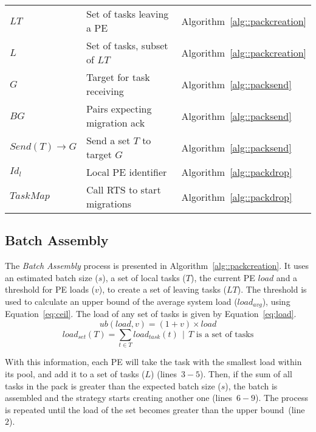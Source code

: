 \begin{table}[t]
\begin{tabular}{l l l}
		$LT$				& Set of tasks leaving a PE 							& Algorithm~\ref{alg::packcreation} \\
		$L$				& Set of tasks, subset of $LT$						& Algorithm~\ref{alg::packcreation} \\
		$G$				& Target for task receiving							& Algorithm~\ref{alg::packsend} \\
		$BG$				& Pairs expecting migration ack						& Algorithm~\ref{alg::packsend} \\ 
		$Send(T)\rightarrow G $ & Send a set $T$ to target $G$				& Algorithm~\ref{alg::packsend} \\ 
		$Id_l$ 			& Local PE identifier								& Algorithm~\ref{alg::packdrop} \\
		$TaskMap$		& Call RTS to start migrations						& Algorithm~\ref{alg::packdrop} \\
		\bottomrule
	\end{tabular}
	\label{tab:algo:symbols}
\end{table}

\subsection{Batch Assembly} \label{sec:algo:creation}

The \textit{Batch Assembly} process is presented in Algorithm~\ref{alg::packcreation}.
It uses an estimated batch size ($s$), a set of local tasks ($T$), the current PE $load$ and a threshold for PE loads ($v$), to create a set of leaving tasks ($LT$).
The threshold is used to calculate an upper bound of the average system load ($load_{avg}$), using Equation~\ref{eq:ceil}. 
The load of any set of tasks is given by Equation~\ref{eq:load}.
\begin{equation}
	ub(load,v) = (1+v)\times load
    \label{eq:ceil}
\end{equation}
\begin{equation}
	load_{set}(T) = \sum_{t \in T}{load_{task}(t)}\ \ |\ \ T \text{ is a set of tasks}
	\label{eq:load}
\end{equation}

With this information, each PE will take the task with the smallest load within its pool, and add it to a set of tasks ($L$) (lines~$3-5$).
Then, if the sum of all tasks in the pack is greater than the expected batch size ($s$), the batch is assembled and the strategy starts creating another one (lines~$6-9$).
The process is repeated until the load of the set becomes greater than the upper bound~(line~$2$).

